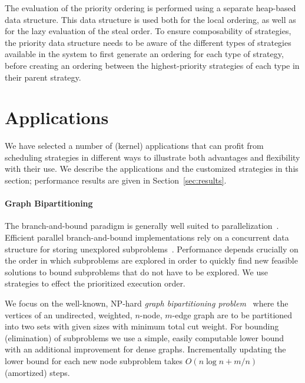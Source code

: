 \documentclass[a4paper,11pt]{article}
\begin{document}
The evaluation of the priority ordering is performed using a separate
heap-based data structure. This data structure is used both for the
local ordering, as well as for the lazy evaluation of the steal
order. To ensure composability of strategies, the priority
data structure needs to be aware of the different types of strategies
available in the system to first generate an ordering for each type of
strategy, before creating an ordering between the highest-priority
strategies of each type in their parent strategy.

\section{Applications}
\label{sec:applications}

We have selected a number of (kernel) applications that can profit
from scheduling strategies in different ways to
illustrate both advantages and flexibility with their use. We
describe the applications and the customized strategies in this
section; performance results are given in Section~\ref{sec:results}.

\paragraph{Graph Bipartitioning}
\label{sec:bb}

The branch-and-bound paradigm is generally well suited to
parallelization~\cite{CrainicLeCunRoucairol2006}.  Efficient parallel
branch-and-bound implementations rely on a concurrent data structure
for storing unexplored
subproblems~\cite{HerleyPietracaprinaPucci99,KarpZhang93,Sanders95}.
Performance depends crucially on the order in which subproblems are
explored in order to quickly find new feasible solutions to bound
subproblems that do not have to be explored.  We use strategies to
effect the prioritized execution order.

We focus on the well-known, NP-hard \emph{graph bipartitioning
  problem}~\cite{PapadimitriouSteiglitz82} where the vertices of an
undirected, weighted, $n$-node, $m$-edge graph are to be partitioned
into two sets with given sizes with minimum total cut weight. For
bounding (elimination) of subproblems we use a simple, easily
computable lower bound~\cite{Traff91:or} with an
additional improvement for dense graphs. Incrementally updating the
lower bound for each new node subproblem takes $O(n\log
n+m/n)$ (amortized) steps.
\end{document}
